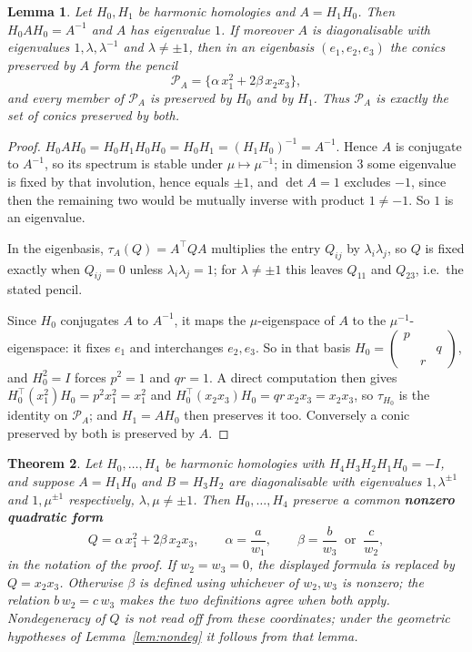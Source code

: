 \documentclass[11pt,a4paper]{article}
\theoremstyle{plain}
\newtheorem{theorem}{Theorem}[section]
\newtheorem{lemma}[theorem]{Lemma}
\theoremstyle{definition}
\theoremstyle{remark}
\begin{document}
\begin{lemma}\label{lem:pair}
Let $H_0,H_1$ be harmonic homologies and $A=H_1H_0$. Then $H_0AH_0=A^{-1}$ and $A$
has eigenvalue $1$. If moreover $A$ is diagonalisable with eigenvalues
$1,\lambda,\lambda^{-1}$ and $\lambda\neq\pm1$, then in an eigenbasis
$(e_1,e_2,e_3)$ the conics preserved by $A$ form the pencil
\[
  \mathcal{P}_A=\{\alpha\,x_1^2+2\beta\,x_2x_3\},
\]
and every member of $\mathcal{P}_A$ is preserved by $H_0$ and by $H_1$. Thus
$\mathcal{P}_A$ is exactly the set of conics preserved by both.
\end{lemma}

\begin{proof}
$H_0AH_0=H_0H_1H_0H_0=H_0H_1=(H_1H_0)^{-1}=A^{-1}$. Hence $A$ is conjugate to
$A^{-1}$, so its spectrum is stable under $\mu\mapsto\mu^{-1}$; in dimension $3$
some eigenvalue is fixed by that involution, hence equals $\pm1$, and $\det A=1$
excludes $-1$, since then the remaining two would be mutually inverse with product
$1\neq-1$. So $1$ is an eigenvalue.

In the eigenbasis, $\tau_A(Q)=A^\top QA$ multiplies the entry $Q_{ij}$ by
$\lambda_i\lambda_j$, so $Q$ is fixed exactly when $Q_{ij}=0$ unless
$\lambda_i\lambda_j=1$; for $\lambda\neq\pm1$ this leaves $Q_{11}$ and $Q_{23}$,
i.e.\ the stated pencil.

Since $H_0$ conjugates $A$ to $A^{-1}$, it maps the $\mu$-eigenspace of $A$ to the
$\mu^{-1}$-eigenspace: it fixes $e_1$ and interchanges $e_2,e_3$. So in that basis
$H_0=\begin{pmatrix}p&&\\&&q\\&r&\end{pmatrix}$, and $H_0^2=I$ forces $p^2=1$ and
$qr=1$. A direct computation then gives $H_0^\top(x_1^2)H_0=p^2x_1^2=x_1^2$ and
$H_0^\top(x_2x_3)H_0=qr\,x_2x_3=x_2x_3$, so $\tau_{H_0}$ is the identity on
$\mathcal{P}_A$; and $H_1=AH_0$ then preserves it too. Conversely a conic preserved
by both is preserved by $A$.
\end{proof}

\begin{theorem}\label{thm:threshold}
Let $H_0,\dots,H_4$ be harmonic homologies with $H_4H_3H_2H_1H_0=-I$, and suppose
$A=H_1H_0$ and $B=H_3H_2$ are diagonalisable with eigenvalues $1,\lambda^{\pm1}$
and $1,\mu^{\pm1}$ respectively, $\lambda,\mu\neq\pm1$. Then $H_0,\dots,H_4$ preserve a
common \textbf{nonzero quadratic form}
\[
  Q=\alpha\,x_1^2+2\beta\,x_2x_3,\qquad
  \alpha=\frac{a}{w_1},\qquad
  \beta=\frac{b}{w_3}\ \text{ or }\ \frac{c}{w_2},
\]
in the notation of the proof. If $w_2=w_3=0$, the displayed formula is replaced by
$Q=x_2x_3$. Otherwise $\beta$ is defined using whichever of $w_2,w_3$ is nonzero;
the relation $b\,w_2=c\,w_3$ makes the two definitions agree when both apply.
Nondegeneracy of $Q$ is not read off from these coordinates; under the geometric
hypotheses of Lemma~\ref{lem:nondeg} it follows from that lemma.
\end{theorem}
\end{document}
